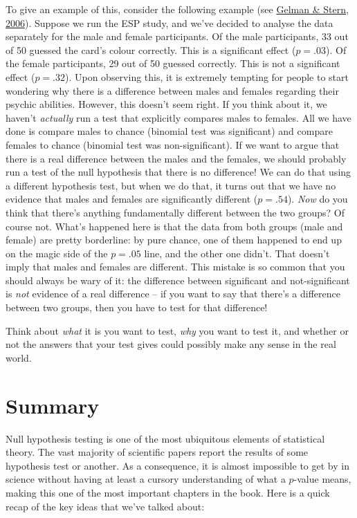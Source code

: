 \documentclass[
]{book}
\theoremstyle{definition}
\theoremstyle{definition}
\theoremstyle{definition}
\theoremstyle{definition}
\theoremstyle{remark}
\begin{document}
To give an example of this, consider the following example (see \protect\hyperlink{ref-Gelman2006}{Gelman \& Stern, 2006}). Suppose we run the ESP study, and we've decided to analyse the data separately for the male and female participants. Of the male participants, 33 out of 50 guessed the card's colour correctly. This is a significant effect (\(p = .03\)). Of the female participants, 29 out of 50 guessed correctly. This is not a significant effect (\(p = .32\)). Upon observing this, it is extremely tempting for people to start wondering why there is a difference between males and females regarding their psychic abilities. However, this doesn't seem right. If you think about it, we haven't \emph{actually} run a test that explicitly compares males to females. All we have done is compare males to chance (binomial test was significant) and compare females to chance (binomial test was non-significant). If we want to argue that there is a real difference between the males and the females, we should probably run a test of the null hypothesis that there is no difference! We can do that using a different hypothesis test, but when we do that, it turns out that we have no evidence that males and females are significantly different (\(p = .54\)). \emph{Now} do you think that there's anything fundamentally different between the two groups? Of course not. What's happened here is that the data from both groups (male and female) are pretty borderline: by pure chance, one of them happened to end up on the magic side of the \(p = .05\) line, and the other one didn't. That doesn't imply that males and females are different. This mistake is so common that you should always be wary of it: the difference between significant and not-significant is \emph{not} evidence of a real difference -- if you want to say that there's a difference between two groups, then you have to test for that difference!

Think about \emph{what} it is you want to test, \emph{why} you want to test it, and whether or not the answers that your test gives could possibly make any sense in the real world.

\hypertarget{summary-4}{%
\section{Summary}\label{summary-4}}

Null hypothesis testing is one of the most ubiquitous elements of statistical theory. The vast majority of scientific papers report the results of some hypothesis test or another. As a consequence, it is almost impossible to get by in science without having at least a cursory understanding of what a \(p\)-value means, making this one of the most important chapters in the book. Here is a quick recap of the key ideas that we've talked about:
\end{document}

